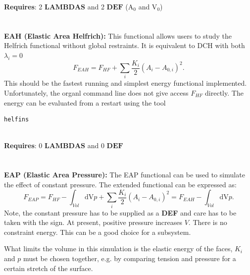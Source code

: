 \documentclass[11pt]{article}
\newcommand{\D}[1]{\mathrm{d#1}}
\begin{document}
\noindent
\textbf{Requires}: 2 $\textbf{LAMBDAS}$ and 2 $\textbf{DEF}$ (A$_0$ and V$_0$) \\
\noindent \\
\vspace{0.2 cm} \\
\textbf{EAH (Elastic Area Helfrich):}
This functional allows users to study the Helfrich functional without global restraints. It is equivalent to DCH with both $\lambda_i = 0$
\begin{equation}    
 F_{EAH} = F_{HF} + \sum_i \frac{K_i}{2}(A_i-A_{0,i})^2
 . 
 \end{equation}
\noindent
This should be the fastest running and simplest energy functional implemented. Unfortunately, the organl command line does not give access $F_{HF}$ directly. The energy can be evaluated from a restart using the tool \begin{verbatim}helfins \end{verbatim} \\
\noindent
\textbf{Requires}: 0 $\textbf{LAMBDAS}$ and 0 $\textbf{DEF}$ \\
\noindent \\
\vspace{0.2 cm} \\
\textbf{EAP (Elastic Area Pressure):}
The EAP functional can be used to simulate the effect of constant pressure. The extended functional can be expressed as:
 \begin{equation}
 F_{EAP} = F_{HF} - \int_{Vol} \D{V} p + \sum_i \frac{K_i}{2}(A_i-A_{0,i})^2 = F_{EAH} - \int_{Vol} \D{V} p.
 \end{equation}
Note, the constant pressure has to be supplied as a \textbf{DEF} and care has to be taken with the sign. At present, positive pressure increases $V$. There is no constraint energy. This can be a good choice for a subsystem.

\begin{tcolorbox}[colback=orange!5!white,colframe=orange!75!black,title=Clarification]
    What limits the volume in this simulation is the elastic energy of the faces, $K_i$ and $p$ must be chosen together, 
    e.g. by comparing tension and pressure for a certain stretch of the surface. 

\end{tcolorbox}
\end{document}
